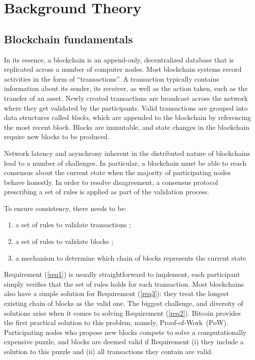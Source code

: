 \chapter{Background Theory}
\label{ch:background}
\section{Blockchain fundamentals}
In its essence, a blockchain is an append-only, decentralized database that is replicated across a number of computer nodes. 
Most blockchain systems record activities in the form of ``transactions''. 
A transaction typically contains information about its sender, its receiver, as well as the action taken, such as the transfer of an asset. 
Newly created transactions are broadcast across the network where they get validated by the participants. 
Valid transactions are grouped into data structures called \textit{blocks}, which are appended to the blockchain by referencing the most recent block.
Blocks are immutable, and state changes in the blockchain require new blocks to be produced.

Network latency and asynchrony inherent in the distributed nature of blockchains lead to a number of challenges. 
In particular, a blockchain must be able to reach consensus about the current state when the majority of participating nodes behave honestly. 
In order to resolve disagreement, a consensus protocol prescribing a set of rules is applied as part of the validation process. 

To ensure consistency, there needs to be:

\begin{enumerate}\itemsep=-1pt
\item a set of rules to validate transactions \label{req1};
\item a set of rules to validate blocks \label{req2};
\item a mechanism to determine which chain of blocks represents the current state \label{req3}
\end{enumerate}
%
Requirement (\ref{req1}) is usually straightforward to implement, each participant simply verifies that the set of rules holds for each transaction.
Most blockchains also have a simple solution for Requirement (\ref{req3}): they treat the longest existing chain of blocks as the valid one.
The biggest challenge, and diversity of solutions arise when it comes to solving Requirement (\ref{req2}).
Bitcoin provides the first practical solution to this problem, namely, Proof-of-Work~(PoW). Participating nodes who propose new blocks compete to solve a computationally expensive puzzle, and blocks are deemed valid if Requirement (i) they include a solution to this puzzle and (ii) all transactions they contain are valid.

